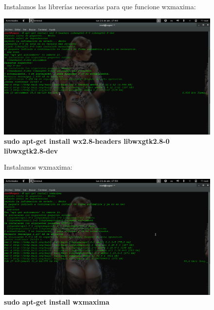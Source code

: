 \documentclass[10pt,a4paper]{book}
\begin{document}
\begin{small}
\begin{enumerate}
\begin{figure}[htb]
\item Instalamos las librerías necesarias para que funcione wxmaxima:\\
\begin{center}
\includegraphics[width=13cm]{fotos/cap4}
\caption{\textbf{sudo apt-get install wx2.8-headers libwxgtk2.8-0 libwxgtk2.8-dev}}
\end{center}
\end{figure}


\begin{figure}[htb]
\item Instalamos wxmaxima:\\
\begin{center}
\includegraphics[width=13cm]{fotos/cap6}
\caption{\textbf{sudo apt-get install wxmaxima}}
\end{center}
\end{figure}



\end{enumerate}
\end{small}
\end{document}
